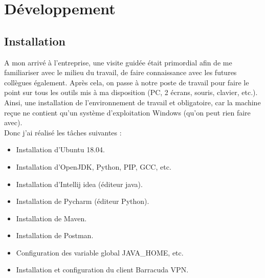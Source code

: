 \section{Développement}
\subsection{Installation}
A mon arrivé à l'entreprise, une visite guidée était primordial afin de me familiariser avec le milieu du travail, de faire connaissance avec les futures collègues également. Après cela, on passe à notre poste de travail pour faire le point sur tous les outils mis à ma disposition (PC, 2 écrans, souris, clavier, etc.). Ainsi, une installation de l'environnement de travail et obligatoire, car la machine reçue ne contient qu'un système d’exploitation Windows (qu'on peut rien faire avec).\\
Donc j'ai réalisé les tâches suivantes :
\begin{itemize}
	\item Installation d'Ubuntu 18.04.
	\item Installation d'OpenJDK, Python, PIP, GCC, etc.  
	\item Installation d'Intellij idea (éditeur java).
	\item Installation de Pycharm (éditeur Python).
	\item Installation de Maven.
	\item Installation de Postman.
	\item Configuration des variable global JAVA{\_}HOME, etc.
	\item Installation et configuration du client Barracuda VPN.
\end{itemize}
